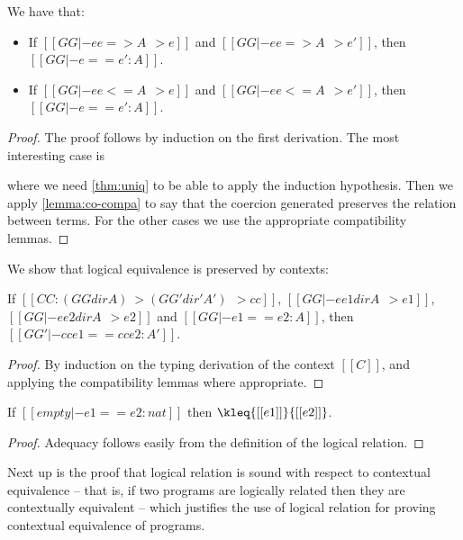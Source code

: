 \begin{theorem}  \label{thm:co-log} We have that:
  \begin{itemize}
  \item If $[[GG |- ee => A ~~> e]]$ and $[[GG |- ee => A ~~> e']]$, then $[[GG |- e == e' : A ]]$.
  \item If $[[GG |- ee <= A ~~> e]]$ and $[[GG |- ee <= A ~~> e']]$, then $[[GG |- e == e' : A ]]$.
  \end{itemize}
\end{theorem}
\begin{proof}
  The proof follows by induction on the first derivation. The most interesting
  case is 
  \begin{mathpar}
  \end{mathpar}
  where we need \cref{thm:uniq} to be able to apply the induction hypothesis.
  Then we apply \cref{lemma:co-compa} to say that the coercion generated
  preserves the relation between terms. For the other cases we use the
  appropriate compatibility lemmas.
\end{proof}


We show that logical equivalence is preserved by \namee contexts:

\begin{lemma}[Congruence] \label{lemma:cong}
 If $[[CC : (GG dir A) ~> (GG' dir' A') ~~> cc]]$, $[[GG |- ee1 dir A ~~> e1]]$, $[[GG |- ee2 dir A ~~> e2]]$
 and $[[GG |- e1 == e2 : A]]$, then $[[GG' |- cc{e1} == cc{e2} : A']]$.
\end{lemma}
\begin{proof}
  By induction on the typing derivation of the context $[[C]]$, and applying
  the compatibility lemmas where appropriate.
\end{proof}


\begin{lemma}[Adequacy] \label{lemma:ade}
  If $[[  empty |- e1 == e2 : nat ]]$ then $\kleq{[[e1]]}{[[e2]]}$.
\end{lemma}
\begin{proof}
  Adequacy follows easily from the definition of the logical relation.
\end{proof}


Next up is the proof that logical relation is sound with respect to contextual
equivalence -- that is, if two programs are logically related then they are
contextually equivalent -- which justifies the use of logical relation for
proving contextual equivalence of programs.

